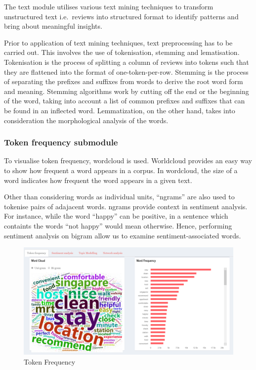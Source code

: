 \documentclass{acm_proc_article-sp}
\begin{document}
The text module utilises various text mining techniques to transform
unstructured text i.e.~reviews into structured format to identify
patterns and bring about meaningful insights.

Prior to application of text mining techniques, text preprocessing has
to be carried out. This involves the use of tokenisation, stemming and
lematisation. Tokenisation is the process of splitting a column of
reviews into tokens such that they are flattened into the format of
one-token-per-row. Stemming is the process of separating the prefixes
and suffixes from words to derive the root word form and meaning.
Stemming algorithms work by cutting off the end or the beginning of the
word, taking into account a list of common prefixes and suffixes that
can be found in an inflected word. Lemmatization, on the other hand,
takes into consideration the morphological analysis of the words.

\hypertarget{token-frequency-submodule}{%
\subsubsection{Token frequency
submodule}\label{token-frequency-submodule}}

To visualise token frequency, wordcloud is used. Worldcloud provides an
easy way to show how frequent a word appears in a corpus. In wordcloud,
the size of a word indicates how frequent the word appears in a given
text.

Other than considering words as individual units, ``ngrams'' are also
used to tokenise pairs of adajacent words. ngrams provide context in
sentiment analysis. For instance, while the word ``happy'' can be
positive, in a sentence which containts the words ``not happy'' would
mean otherwise. Hence, performing sentiment analysis on bigram allow us
to examine sentiment-associated words.

\begin{figure}[H]

{\centering \includegraphics[width=1\linewidth]{images/tokenfrequency} 

}

\caption{Token Frequency}\label{fig:unnamed-chunk-5}
\end{figure}
\end{document}
